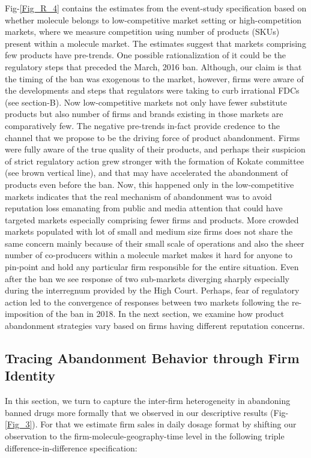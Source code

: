 \documentclass[AER]{AEA}
\theoremstyle{theorem}
\begin{document}
Fig-\ref{Fig_R_4} contains the estimates from the event-study specification based on whether molecule belongs to low-competitive market setting or high-competition markets, where we measure competition using number of products (SKUs) present within a molecule market. The estimates suggest that markets comprising few products have pre-trends. One possible rationalization of it could be the regulatory steps that preceded the March, 2016 ban. Although, our claim is that the timing of the ban was exogenous to the market, however, firms were aware of the developments and steps that regulators were taking to curb irrational FDCs (see section-B). Now low-competitive markets not only have fewer substitute products but also number of firms and brands existing in those markets are comparatively few. The negative pre-trends in-fact provide credence to the channel that we propose to be the driving force of product abandonment. Firms were fully aware of the true quality of their products, and perhaps their suspicion of strict regulatory action grew stronger with the formation of Kokate committee (see brown vertical line), and that may have accelerated the abandonment of products even before the ban. Now, this happened only in the low-competitive markets indicates that the real mechanism of abandonment was to avoid reputation loss emanating from  public and media attention that could have targeted markets especially comprising fewer firms and products. More crowded markets populated with lot of small and medium size firms does not share the same concern mainly because of their small scale of operations and also the sheer number of co-producers within a molecule market makes it hard for anyone to pin-point and hold any particular firm responsible for the entire situation. Even after the ban we see response of two sub-markets diverging sharply especially during the interregnum provided by the High Court. Perhaps, fear of regulatory action led to the convergence of responses between two markets following the re-imposition of the ban in 2018. In the next section, we examine how  product abandonment strategies vary based on firms having different reputation concerns.

\subsection{Tracing Abandonment Behavior through Firm Identity}

In this section, we turn to capture the inter-firm heterogeneity in abandoning banned drugs more formally that we observed in our descriptive results (Fig-\ref{Fig_3}). For that we estimate firm sales in daily dosage format by shifting our observation to the firm-molecule-geography-time level in the following triple difference-in-difference specification:
\end{document}
